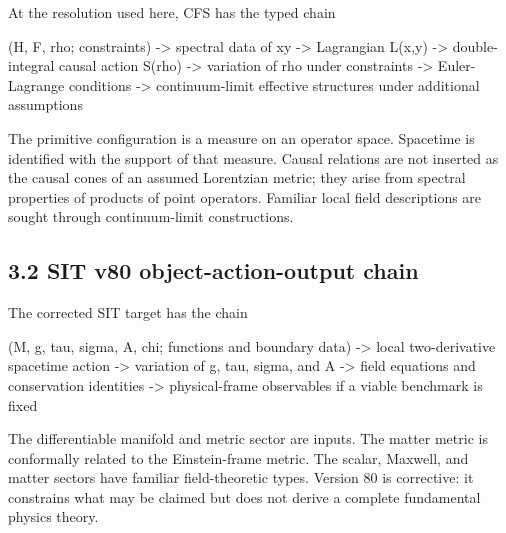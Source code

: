 \documentclass[
  american,
  11pt,
  letterpaper,
]{article}
\newenvironment{Shaded}{}{}
\newcommand{\NormalTok}[1]{#1}
\begin{document}
At the resolution used here, CFS has the typed chain

\begin{Shaded}
\begin{Highlighting}[]
\NormalTok{(H, F, rho; constraints)}
\NormalTok{    {-}\textgreater{} spectral data of xy}
\NormalTok{    {-}\textgreater{} Lagrangian L(x,y)}
\NormalTok{    {-}\textgreater{} double{-}integral causal action S(rho)}
\NormalTok{    {-}\textgreater{} variation of rho under constraints}
\NormalTok{    {-}\textgreater{} Euler{-}Lagrange conditions}
\NormalTok{    {-}\textgreater{} continuum{-}limit effective structures under additional assumptions}
\end{Highlighting}
\end{Shaded}

The primitive configuration is a measure on an operator space. Spacetime is identified with the support of that measure. Causal relations are not inserted as the causal cones of an assumed Lorentzian metric; they arise from spectral properties of products of point operators. Familiar local field descriptions are sought through continuum-limit constructions.

\subsection{3.2 SIT v80 object-action-output chain}\label{sit-v80-object-action-output-chain}

The corrected SIT target has the chain

\begin{Shaded}
\begin{Highlighting}[]
\NormalTok{(M, g, tau, sigma, A, chi; functions and boundary data)}
\NormalTok{    {-}\textgreater{} local two{-}derivative spacetime action}
\NormalTok{    {-}\textgreater{} variation of g, tau, sigma, and A}
\NormalTok{    {-}\textgreater{} field equations and conservation identities}
\NormalTok{    {-}\textgreater{} physical{-}frame observables if a viable benchmark is fixed}
\end{Highlighting}
\end{Shaded}

The differentiable manifold and metric sector are inputs. The matter metric is conformally related to the Einstein-frame metric. The scalar, Maxwell, and matter sectors have familiar field-theoretic types. Version 80 is corrective: it constrains what may be claimed but does not derive a complete fundamental physics theory.
\end{document}

